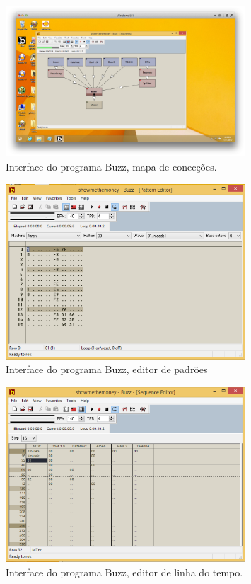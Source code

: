 \begin{figure}

\includegraphics[width=0.8\textwidth]{pictures/cap1/buzz1}
\caption{Interface do programa Buzz, mapa de conecções.}
\label{fig:buzz1}
\end{figure}

\begin{figure}

\includegraphics[width=0.8\textwidth]{pictures/cap1/buzz}
\caption{Interface do programa Buzz, editor de padrões}
\label{fig:buzz}
\end{figure}

\begin{figure}

\includegraphics[width=0.8\textwidth]{pictures/cap1/buzz3}
\caption{Interface do programa Buzz, editor de linha do tempo.}
\label{fig:buzz3}
\end{figure}

